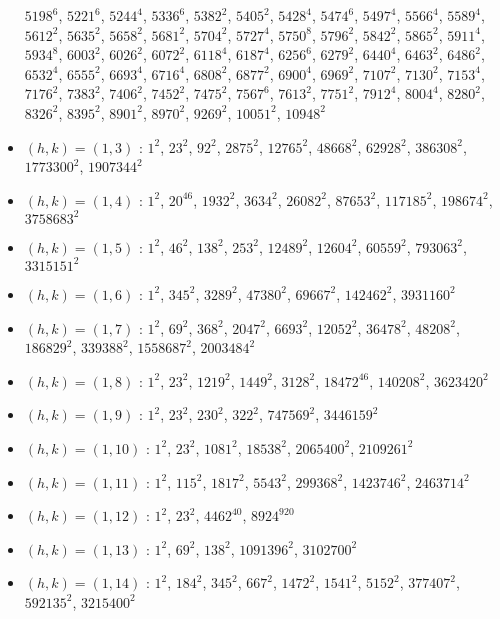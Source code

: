 \begin{itemize}
$5198^{6}$, $5221^{6}$, $5244^{4}$, $5336^{6}$, $5382^{2}$, $5405^{2}$, $5428^{4}$, $5474^{6}$, $5497^{4}$, $5566^{4}$, $5589^{4}$, $5612^{2}$, $5635^{2}$, $5658^{2}$, $5681^{2}$, $5704^{2}$, $5727^{4}$, $5750^{8}$, $5796^{2}$, $5842^{2}$, $5865^{2}$, $5911^{4}$, $5934^{8}$, $6003^{2}$, $6026^{2}$, $6072^{2}$, $6118^{4}$, $6187^{4}$, $6256^{6}$, $6279^{2}$, $6440^{4}$, $6463^{2}$, $6486^{2}$, $6532^{4}$, $6555^{2}$, $6693^{4}$, $6716^{4}$, $6808^{2}$, $6877^{2}$, $6900^{4}$, $6969^{2}$, $7107^{2}$, $7130^{2}$, $7153^{4}$, $7176^{2}$, $7383^{2}$, $7406^{2}$, $7452^{2}$, $7475^{2}$, $7567^{6}$, $7613^{2}$, $7751^{2}$, $7912^{4}$, $8004^{4}$, $8280^{2}$, $8326^{2}$, $8395^{2}$, $8901^{2}$, $8970^{2}$, $9269^{2}$, $10051^{2}$, $10948^{2}$
\item $(h,k)=(1,3)$ : $1^{2}$, $23^{2}$, $92^{2}$, $2875^{2}$, $12765^{2}$, $48668^{2}$, $62928^{2}$, $386308^{2}$, $1773300^{2}$, $1907344^{2}$
\item $(h,k)=(1,4)$ : $1^{2}$, $20^{46}$, $1932^{2}$, $3634^{2}$, $26082^{2}$, $87653^{2}$, $117185^{2}$, $198674^{2}$, $3758683^{2}$
\item $(h,k)=(1,5)$ : $1^{2}$, $46^{2}$, $138^{2}$, $253^{2}$, $12489^{2}$, $12604^{2}$, $60559^{2}$, $793063^{2}$, $3315151^{2}$
\item $(h,k)=(1,6)$ : $1^{2}$, $345^{2}$, $3289^{2}$, $47380^{2}$, $69667^{2}$, $142462^{2}$, $3931160^{2}$
\item $(h,k)=(1,7)$ : $1^{2}$, $69^{2}$, $368^{2}$, $2047^{2}$, $6693^{2}$, $12052^{2}$, $36478^{2}$, $48208^{2}$, $186829^{2}$, $339388^{2}$, $1558687^{2}$, $2003484^{2}$
\item $(h,k)=(1,8)$ : $1^{2}$, $23^{2}$, $1219^{2}$, $1449^{2}$, $3128^{2}$, $18472^{46}$, $140208^{2}$, $3623420^{2}$
\item $(h,k)=(1,9)$ : $1^{2}$, $23^{2}$, $230^{2}$, $322^{2}$, $747569^{2}$, $3446159^{2}$
\item $(h,k)=(1,10)$ : $1^{2}$, $23^{2}$, $1081^{2}$, $18538^{2}$, $2065400^{2}$, $2109261^{2}$
\item $(h,k)=(1,11)$ : $1^{2}$, $115^{2}$, $1817^{2}$, $5543^{2}$, $299368^{2}$, $1423746^{2}$, $2463714^{2}$
\item $(h,k)=(1,12)$ : $1^{2}$, $23^{2}$, $4462^{40}$, $8924^{920}$
\item $(h,k)=(1,13)$ : $1^{2}$, $69^{2}$, $138^{2}$, $1091396^{2}$, $3102700^{2}$
\item $(h,k)=(1,14)$ : $1^{2}$, $184^{2}$, $345^{2}$, $667^{2}$, $1472^{2}$, $1541^{2}$, $5152^{2}$, $377407^{2}$, $592135^{2}$, $3215400^{2}$

\end{itemize}
